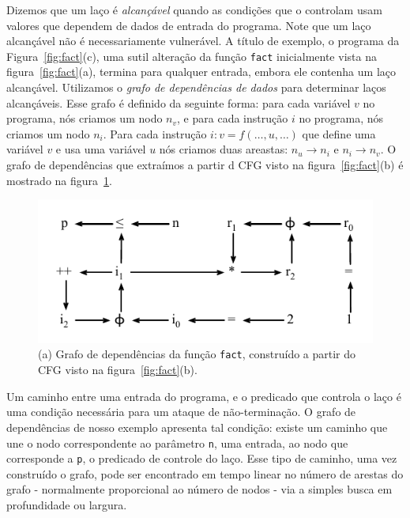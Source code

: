 \documentclass{llncs}
\begin{document}
Dizemos que um laço é {\em alcançável} quando as condições que o controlam
usam valores que dependem de dados de entrada do programa.
Note que um laço alcançável não é necessariamente vulnerável.
A título de exemplo, o programa da Figura~\ref{fig:fact}(c), uma sutil
alteração da função \texttt{fact} inicialmente vista na
figura~\ref{fig:fact}(a), termina para qualquer entrada, embora ele contenha
um laço alcançável.
Utilizamos o {\em grafo de dependências de dados} para determinar laços
alcançáveis.
Esse grafo é definido da seguinte forma:
para cada variável $v$ no programa, nós criamos um nodo $n_v$, e para cada
instrução $i$ no programa, nós criamos um nodo $n_i$.
Para cada instrução $i: v = f(\ldots, u, \ldots)$ que define uma variável $v$ e
usa uma variável $u$ n\'{o}s criamos duas areastas: $n_u \rightarrow n_i$ e
$n_i \rightarrow n_v$.
O grafo de dependências que extraímos a partir d CFG visto na
figura~\ref{fig:fact}(b) é mostrado na figura~\ref{fig:depGraph}.

\begin{figure}[t!]
\begin{center}
\includegraphics{images/depGraph}
\caption{(a) Grafo de dependências da função \texttt{fact}, construído a
partir do CFG visto na figura~\ref{fig:fact}(b).}
\label{fig:depGraph}
\end{center}
\end{figure}

Um caminho entre uma entrada do programa, e o predicado que controla o laço é
uma condição necessária para um ataque de não-terminação.
O grafo de dependências de nosso exemplo apresenta tal condição:
existe um caminho que une o nodo correspondente ao parâmetro \texttt{n}, uma
entrada, ao nodo que corresponde a \texttt{p}, o predicado de controle do
laço.
Esse tipo de caminho, uma vez construído o grafo, pode ser encontrado em
tempo linear no número de arestas do grafo - normalmente proporcional ao
número de nodos - via a simples busca em profundidade ou largura.
\end{document}
